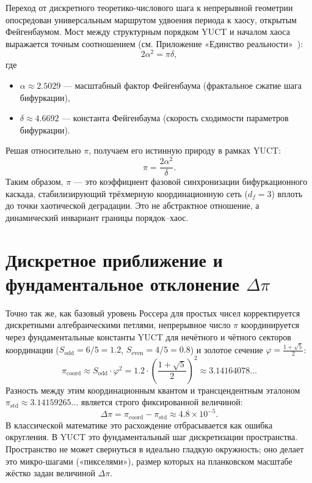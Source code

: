 \documentclass[12pt,a4paper]{article}
\newcommand{\Sodd}{S_{\mathrm{odd}}}
\newcommand{\Seven}{S_{\mathrm{even}}}
\newcommand{\df}{d_{\!f}}  %
\begin{document}
	Переход от дискретного теоретико-числового шага к непрерывной геометрии опосредован универсальным маршрутом удвоения периода к хаосу, открытым Фейгенбаумом. Мост между структурным порядком YUCT и началом хаоса выражается точным соотношением (см. Приложение «Единство реальности»~\cite{UnityReality}):
	\begin{equation}
		2\alpha^2 = \pi\delta,
		\label{eq:bridge}
	\end{equation}
	где
	\begin{itemize}
		\item $\alpha \approx 2.5029$ — масштабный фактор Фейгенбаума (фрактальное сжатие шага бифуркации),
		\item $\delta \approx 4.6692$ — константа Фейгенбаума (скорость сходимости параметров бифуркации).
	\end{itemize}
	Решая относительно $\pi$, получаем его истинную природу в рамках YUCT:
	\begin{equation}
		\boxed{\pi = \frac{2\alpha^2}{\delta}}.
		\label{eq:pi-from-feigenbaum}
	\end{equation}
	Таким образом, $\pi$ — это коэффициент фазовой синхронизации бифуркационного каскада, стабилизирующий трёхмерную координационную сеть ($\df=3$) вплоть до точки хаотической деградации. Это не абстрактное отношение, а динамический инвариант границы порядок–хаос.
	
	\section{Дискретное приближение и фундаментальное отклонение $\Delta\pi$}
	\label{sec:delta-pi}
	
	Точно так же, как базовый уровень Россера для простых чисел корректируется дискретными алгебраическими петлями, непрерывное число $\pi$ координируется через фундаментальные константы YUCT для нечётного и чётного секторов координации ($\Sodd = 6/5 = 1.2$, $\Seven = 4/5 = 0.8$) и золотое сечение $\varphi = \frac{1+\sqrt{5}}{2}$:
	\begin{equation}
		\pi_{\mathrm{coord}} \approx \Sodd \cdot \varphi^2 = 1.2 \cdot \left(\frac{1+\sqrt{5}}{2}\right)^2 \approx 3.14164078\ldots
		\label{eq:pi-approx}
	\end{equation}
	Разность между этим координационным квантом и трансцендентным эталоном $\pi_{\mathrm{std}} \approx 3.14159265\ldots$ является строго фиксированной величиной:
	\begin{equation}
		\Delta\pi = \pi_{\mathrm{coord}} - \pi_{\mathrm{std}} \approx 4.8 \times 10^{-5}.
		\label{eq:delta-pi-val}
	\end{equation}
	В классической математике это расхождение отбрасывается как ошибка округления. В YUCT это фундаментальный шаг дискретизации пространства. Пространство не может свернуться в идеально гладкую окружность; оно делает это микро-шагами («пикселями»), размер которых на планковском масштабе жёстко задан величиной $\Delta\pi$.
	
\end{document}
